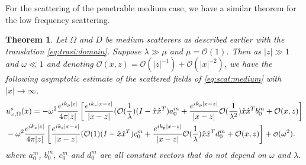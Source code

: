 \documentclass[a4paper,11pt]{article}
\newcommand{\mO}{\mathcal{O}}
\newcommand\smallO{
  \mathchoice
    {{\scriptstyle\mathcal{O}}}%
    {{\scriptstyle\mathcal{O}}}%
    {{\scriptscriptstyle\mathcal{O}}}%
    {\scalebox{.7}{$\scriptscriptstyle\mathcal{O}$}}%
  }
\newtheorem{theorem}{Theorem}[section]
\theoremstyle{remark}
\theoremstyle{definition}
\numberwithin{equation}{section}
\begin{document}
For the scattering of the penetrable medium case, we have a similar theorem for the low frequency scattering.
\begin{theorem}\label{thm:medium:asym}
Let $\Omega$ and $D$ be medium scatterers as described earlier with the translation \eqref{eq:trasi:domain}. Suppose $\lambda  \gg \mu$ and $ \mu = \mO(1)$. Then as $|z| \gg 1$ and $\omega \ll 1$ and denoting $\mO(x,z) = \mO(|z|^{-1}) + \mO(|x|^{-2})$, we
have the following asymptotic estimate of the scattered fields of \eqref{eq:scat:medium} with $|x| \rightarrow \infty$,
\begin{align}
 &u_{\omega,\Omega}^s(x)  = -\omega^2\frac{e^{ik_p|z|}}{4 \pi |z|} \left[ \frac{e^{ik_s|x-z|}}{|x-z|} (\mO(\frac{1}{\lambda})(I-\hat{x}\hat{x}^T)a^m_0 + \frac{e^{ik_p|x-z|}}{|x-z|}\mO(\frac{1}{\lambda^2}) \hat{x}\hat{x}^{T}b^m_0  + \mO(x,z)  \right] \notag \\
 &-\omega^2\frac{e^{ik_s|z|}}{4 \pi |z|} \left[ \frac{e^{ik_s|x-z|}}{|x-z|} (\mO(1)(I-\hat{x}\hat{x}^T)c^m_0  + \frac{e^{ik_p|x-z|}}{|x-z|}
 \mO(\frac{1}{\lambda}) \hat{x}\hat{x}^{T}d^m_0 +  \mO(x,z) \right] + \smallO(\omega^2). \notag
\end{align}
where $a^m_0$, $b^m_0$, $c^m_0$ and $d^m_0$ are all constant vectors that do not depend on $\omega$ and $\lambda$.
\end{theorem}
\end{document}

